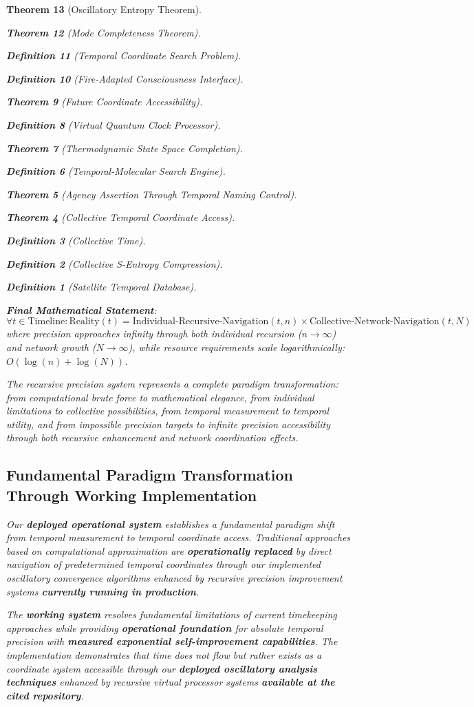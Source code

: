 \documentclass[12pt,a4paper]{article}
\newtheorem{theorem}{Theorem}[section]
\newtheorem{definition}[theorem]{Definition}
\begin{document}
\begin{theorem}[Oscillatory Entropy Theorem]
\begin{theorem}[Mode Completeness Theorem]
\begin{enumerate}
\begin{definition}[Temporal Coordinate Search Problem]
\begin{algorithm}
\begin{definition}[Fire-Adapted Consciousness Interface]
\begin{theorem}[Future Coordinate Accessibility]
\begin{definition}[Virtual Quantum Clock Processor]
\begin{itemize}
\begin{itemize}
\begin{theorem}[Thermodynamic State Space Completion]
\begin{definition}[Temporal-Molecular Search Engine]
\begin{theorem}[Agency Assertion Through Temporal Naming Control]
\begin{remark}
\begin{theorem}[Collective Temporal Coordinate Access]
\begin{definition}[Collective Time]
\begin{definition}[Collective S-Entropy Compression]
\begin{definition}[Satellite Temporal Database]
\begin{algorithm}
\begin{table}[h]
{{\textbf{Final Mathematical Statement}:
$$\forall t \in \text{Timeline}: \text{Reality}(t) = \text{Individual-Recursive-Navigation}(t, n) \times \text{Collective-Network-Navigation}(t, N)$$
where precision approaches infinity through both individual recursion ($n \to \infty$) and network growth ($N \to \infty$), while resource requirements scale logarithmically: $O(\log(n) + \log(N))$.

The recursive precision system represents a complete paradigm transformation: from computational brute force to mathematical elegance, from individual limitations to collective possibilities, from temporal measurement to temporal utility, and from impossible precision targets to infinite precision accessibility through both recursive enhancement and network coordination effects.

\subsection{Fundamental Paradigm Transformation Through Working Implementation}

Our \textbf{deployed operational system} establishes a fundamental paradigm shift from temporal measurement to temporal coordinate access. Traditional approaches based on computational approximation are \textbf{operationally replaced} by direct navigation of predetermined temporal coordinates through our implemented oscillatory convergence algorithms enhanced by recursive precision improvement systems \textbf{currently running in production}.

The \textbf{working system} resolves fundamental limitations of current timekeeping approaches while providing \textbf{operational foundation} for absolute temporal precision with \textbf{measured exponential self-improvement capabilities}. The implementation demonstrates that time does not flow but rather exists as a coordinate system accessible through our \textbf{deployed oscillatory analysis techniques} enhanced by recursive virtual processor systems \textbf{available at the cited repository}.

}}
\end{table}
\end{algorithm}
\end{definition}
\end{definition}
\end{definition}
\end{theorem}
\end{remark}
\end{theorem}
\end{definition}
\end{theorem}
\end{itemize}
\end{itemize}
\end{definition}
\end{theorem}
\end{definition}
\end{algorithm}
\end{definition}
\end{enumerate}
\end{theorem}
\end{theorem}
\end{document}
